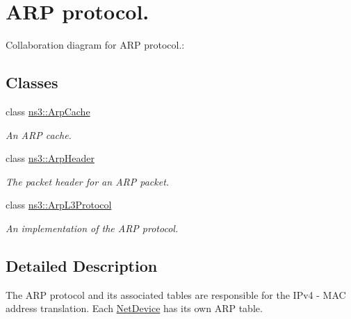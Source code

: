 \hypertarget{group__arp}{}\section{A\+RP protocol.}
\label{group__arp}
Collaboration diagram for A\+RP protocol.\+:
\subsection*{Classes}
\begin{DoxyCompactItemize}
\item 
class \hyperlink{classns3_1_1ArpCache}{ns3\+::\+Arp\+Cache}
\begin{DoxyCompactList}\small\item\em An A\+RP cache. \end{DoxyCompactList}\item 
class \hyperlink{classns3_1_1ArpHeader}{ns3\+::\+Arp\+Header}
\begin{DoxyCompactList}\small\item\em The packet header for an A\+RP packet. \end{DoxyCompactList}\item 
class \hyperlink{classns3_1_1ArpL3Protocol}{ns3\+::\+Arp\+L3\+Protocol}
\begin{DoxyCompactList}\small\item\em An implementation of the A\+RP protocol. \end{DoxyCompactList}\end{DoxyCompactItemize}


\subsection{Detailed Description}
The A\+RP protocol and its associated tables are responsible for the I\+Pv4 -\/ M\+AC address translation. Each \hyperlink{classns3_1_1NetDevice}{Net\+Device} has its own A\+RP table. 